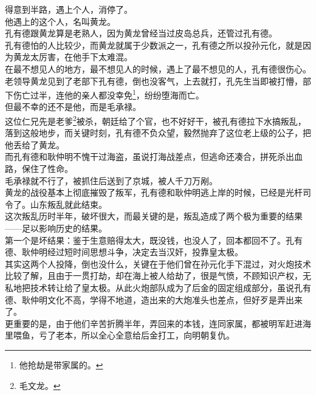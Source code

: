 \begin{multicols}{\theparacolNo}
得意到半路，遇上个人，消停了。\\

他遇上的这个人，名叫黄龙。\\

孔有德跟黄龙算是老熟人，因为黄龙曾经当过皮岛总兵，还管过孔有德。\\

孔有德怕的人比较少，而黄龙就属于少数派之一，孔有德之所以投孙元化，就是因为黄龙太厉害，在他手下太难混。\\

在最不想见人的地方，最不想见人的时候，遇上了最不想见的人，孔有德很伤心。\\

老领导黄龙见到了老部下孔有德，倒也没客气，上去就打，孔先生当即被打懵，部下伤亡过半，连他的亲人都没幸免\footnote{他抢劫是带家属的。}，纷纷堕海而亡。\\

但最不幸的还不是他，而是毛承禄。\\

这位仁兄先是老爹\footnote{毛文龙。}被杀，朝廷给了个官，也不好好干，被孔有德拉下水搞叛乱，落到这般地步，而关键时刻，孔有德不负众望，毅然抛弃了这位老上级的公子，把他丢给了黄龙。\\

而孔有德和耿仲明不愧干过海盗，虽说打海战差点，但逃命还凑合，拼死杀出血路，保住了性命。\\

毛承禄就不行了，被抓住后送到了京城，被人千刀万剐。\\

黄龙的战役基本上彻底摧毁了叛军，孔有德和耿仲明逃上岸的时候，已经是光杆司令了。山东叛乱就此结束。\\

这次叛乱历时半年，破坏很大，而最关键的是，叛乱造成了两个极为重要的结果——足以影响历史的结果。\\

第一个是坏结果：鉴于生意赔得太大，既没钱，也没人了，回本都回不了。孔有德、耿仲明经过短时间思想斗争，决定去当汉奸，投靠皇太极。\\

其实这两个人投降，倒也没什么，关键在于他们曾在孙元化手下混过，对火炮技术比较了解，且由于一贯打劫，却在海上被人给劫了，很是气愤，不顾知识产权，无私地把技术转让给了皇太极。从此火炮部队成为了后金的固定组成部分，虽说孔有德、耿仲明文化不高，学得不地道，造出来的大炮准头也差点，但好歹是弄出来了。\\

更重要的是，由于他们辛苦折腾半年，弄回来的本钱，连同家属，都被明军赶进海里喂鱼，亏了老本，所以全心全意给后金打工，向明朝复仇。\\


\end{multicols}
